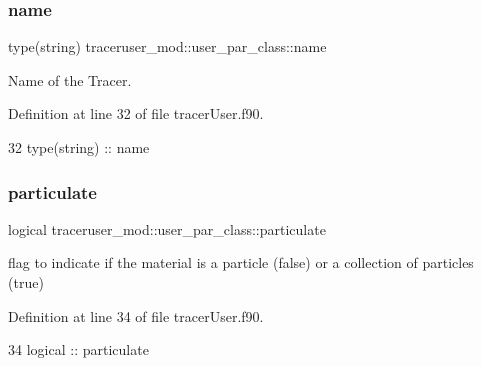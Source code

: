 \subsubsection{\texorpdfstring{name}{name}}
{\footnotesize\ttfamily type(string) traceruser\+\_\+mod\+::user\+\_\+par\+\_\+class\+::name\hspace{0.3cm}{\ttfamily [private]}}



Name of the Tracer. 



Definition at line 32 of file tracer\+User.\+f90.


\begin{DoxyCode}
32         \textcolor{keywordtype}{type}(string) :: name
\end{DoxyCode}
\mbox{\label{structtraceruser__mod_1_1user__par__class_ae217ac0567b650151963309dc107a33f}} 
\subsubsection{\texorpdfstring{particulate}{particulate}}
{\footnotesize\ttfamily logical traceruser\+\_\+mod\+::user\+\_\+par\+\_\+class\+::particulate\hspace{0.3cm}{\ttfamily [private]}}



flag to indicate if the material is a particle (false) or a collection of particles (true) 



Definition at line 34 of file tracer\+User.\+f90.


\begin{DoxyCode}
34         \textcolor{keywordtype}{logical}      :: particulate
\end{DoxyCode}
\mbox{\label{structtraceruser__mod_1_1user__par__class_a9d58d14629e986bbc4a837b3c3116bb9}} 
